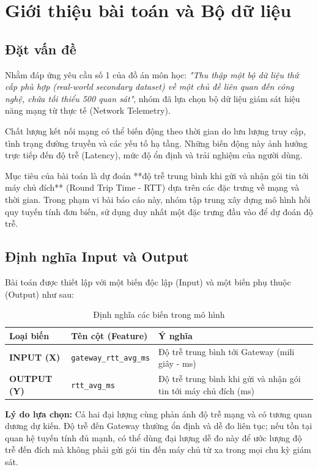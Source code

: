 \section{Giới thiệu bài toán và Bộ dữ liệu}

\subsection{Đặt vấn đề}
Nhằm đáp ứng yêu cầu số 1 của đồ án môn học: \textit{"Thu thập một bộ dữ liệu thứ cấp phù hợp (real-world secondary dataset) về một chủ đề liên quan đến công nghệ, chứa tối thiểu 500 quan sát"}, nhóm đã lựa chọn bộ dữ liệu giám sát hiệu năng mạng từ thực tế (Network Telemetry). 

Chất lượng kết nối mạng có thể biến động theo thời gian do lưu lượng truy cập, tình trạng đường truyền và các yếu tố hạ tầng. Những biến động này ảnh hưởng trực tiếp đến độ trễ (Latency), mức độ ổn định và trải nghiệm của người dùng. 

Mục tiêu của bài toán là dự đoán **độ trễ trung bình khi gửi và nhận gói tin tới máy chủ đích** (Round Trip Time - RTT) dựa trên các đặc trưng về mạng và thời gian. Trong phạm vi bài báo cáo này, nhóm tập trung xây dựng mô hình hồi quy tuyến tính đơn biến, sử dụng duy nhất một đặc trưng đầu vào để dự đoán độ trễ.

\subsection{Định nghĩa Input và Output}

Bài toán được thiết lập với một biến độc lập (Input) và một biến phụ thuộc (Output) như sau:

\begin{table}[H]
    \centering
    \caption{Định nghĩa các biến trong mô hình}
    \begin{tabular}{llp{}}
        \toprule
        \textbf{Loại biến} & \textbf{Tên cột (Feature)} & \textbf{Ý nghĩa} \\
        \midrule
        \textbf{INPUT (X)} & \texttt{gateway\_rtt\_avg\_ms} & Độ trễ trung bình tới Gateway (mili giây - ms) \\
        \addlinespace
        \textbf{OUTPUT (Y)} & \texttt{rtt\_avg\_ms} & Độ trễ trung bình khi gửi và nhận gói tin tới máy chủ đích (ms) \\
        \bottomrule
    \end{tabular}
\end{table}

\textbf{Lý do lựa chọn:} Cả hai đại lượng cùng phản ánh độ trễ mạng và có tương quan dương dự kiến. Độ trễ đến Gateway thường ổn định và dễ đo liên tục; nếu tồn tại quan hệ tuyến tính đủ mạnh, có thể dùng đại lượng dễ đo này để ước lượng độ trễ đến đích mà không phải gửi gói tin đến máy chủ từ xa trong mọi chu kỳ giám sát.
